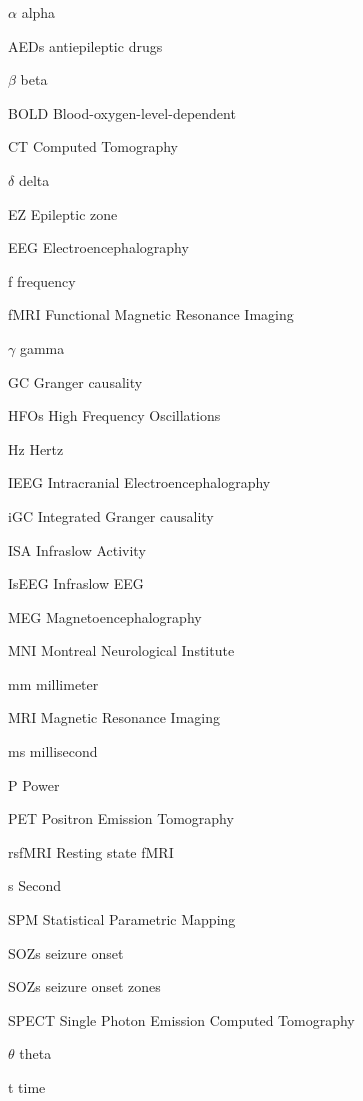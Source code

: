 \begin{abbreviations}
\item[$\alpha$] alpha
\item[AEDs] antiepileptic drugs
\item[$\beta$] beta
\item[BOLD] Blood-oxygen-level-dependent 
\item[CT] Computed Tomography
\item[$\delta$] delta
\item[EZ]   Epileptic zone
\item[EEG] Electroencephalography
\item[f] frequency
\item[fMRI] Functional Magnetic Resonance Imaging
\item[$\gamma$] gamma
\item[GC] Granger causality
\item[HFOs] High Frequency Oscillations
\item[Hz] Hertz
\item[IEEG] Intracranial Electroencephalography
\item[iGC] Integrated Granger causality
\item [ISA] Infraslow Activity
\item [IsEEG] Infraslow EEG
\item[MEG] Magnetoencephalography
\item[MNI] Montreal Neurological Institute
\item[mm] millimeter
\item[MRI] Magnetic Resonance Imaging
\item[ms] millisecond
\item[P] Power
\item[PET] Positron Emission Tomography
\item[rsfMRI] Resting state fMRI   
\item[s] Second
\item[SPM] Statistical Parametric Mapping
\item[SOZs] seizure onset
\item[SOZs] seizure onset zones
\item[SPECT] Single Photon Emission Computed Tomography
\item[$\theta$] theta
\item[t] time
\end{abbreviations}

